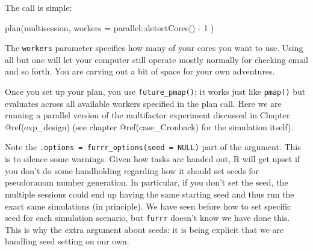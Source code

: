 \documentclass[
]{book}
\newenvironment{Shaded}{\begin{snugshade}}{\end{snugshade}}
\newcommand{\AttributeTok}[1]{\textcolor[rgb]{0.77,0.63,0.00}{#1}}
\newcommand{\ConstantTok}[1]{\textcolor[rgb]{0.00,0.00,0.00}{#1}}
\newcommand{\DecValTok}[1]{\textcolor[rgb]{0.00,0.00,0.81}{#1}}
\newcommand{\FunctionTok}[1]{\textcolor[rgb]{0.00,0.00,0.00}{#1}}
\newcommand{\NormalTok}[1]{#1}
\newcommand{\OtherTok}[1]{\textcolor[rgb]{0.56,0.35,0.01}{#1}}
\newcommand{\SpecialCharTok}[1]{\textcolor[rgb]{0.00,0.00,0.00}{#1}}
\begin{document}
The call is simple:

\begin{Shaded}
\begin{Highlighting}[]
\FunctionTok{plan}\NormalTok{(multisession, }\AttributeTok{workers =}\NormalTok{ parallel}\SpecialCharTok{::}\FunctionTok{detectCores}\NormalTok{() }\SpecialCharTok{{-}} \DecValTok{1}\NormalTok{ )}
\end{Highlighting}
\end{Shaded}

The \texttt{workers} parameter specifies how many of your cores you want to use.
Using all but one will let your computer still operate mostly normally for checking email and so forth.
You are carving out a bit of space for your own adventures.

Once you set up your plan, you use \texttt{future\_pmap()}; it works just like \texttt{pmap()} but evaluates across all available workers specified in the plan call.
Here we are running a parallel version of the multifactor experiment discussed in Chapter @ref(exp\_design) (see chapter @ref(case\_Cronback) for the simulation itself).

\begin{Shaded}
\end{Shaded}

Note the \texttt{.options\ =\ furrr\_options(seed\ =\ NULL)} part of the argument.
This is to silence some warnings.
Given how tasks are handed out, R will get upset if you don't do some handholding regarding how it should set seeds for pseudoranom number generation.
In particular, if you don't set the seed, the multiple sessions could end up having the same starting seed and thus run the exact same simulations (in principle).
We have seen before how to set specific seed for each simulation scenario, but \texttt{furrr} doesn't know we have done this.
This is why the extra argument about seeds: it is being explicit that we are handling seed setting on our own.
\end{document}
